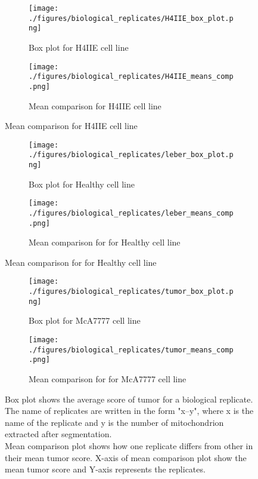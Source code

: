 \begin{figure}[htb!]
    \begin{subfigure}{1\textwidth}
         \centering
        \texttt{[image: ./figures/biological\_replicates/H4IIE\_box\_plot.png]}
        \caption{Box plot for H4IIE cell line}
   \label{fig:fao_raw}
    \end{subfigure}
    \vspace{4em}
  \begin{subfigure}{1\textwidth}
        \centering
       \texttt{[image: ./figures/biological\_replicates/H4IIE\_means\_comp.png]}
        \caption{Mean comparison for H4IIE cell line}
        \label{fig:healthy_raw}
    \end{subfigure}
    
    \end{figure}
    \begin{figure}[htb!]
\ContinuedFloat
    \begin{subfigure}{1\textwidth}
         \centering
        \texttt{[image: ./figures/biological\_replicates/leber\_box\_plot.png]}
        \caption{Box plot for Healthy cell line}
   \label{fig:fao_raw}
    \end{subfigure}
    \begin{subfigure}{1\textwidth}
         \centering
        \texttt{[image: ./figures/biological\_replicates/leber\_means\_comp.png]}
        \caption{Mean comparison for for Healthy cell line}
   \label{fig:fao_raw}
    \end{subfigure}
    
     \end{figure}
    \begin{figure}[htb!]
\ContinuedFloat

 \begin{subfigure}{1\textwidth}
         \centering
        \texttt{[image: ./figures/biological\_replicates/tumor\_box\_plot.png]}
        \caption{Box plot for McA7777 cell line}
   \label{fig:fao_raw}
    \end{subfigure}
    \begin{subfigure}{1\textwidth}
         \centering
        \texttt{[image: ./figures/biological\_replicates/tumor\_means\_comp.png]}
        \caption{Mean comparison for for McA7777 cell line}
   \label{fig:fao_raw}
    \end{subfigure}
    \label{fig:replicate_box_plot}
\caption{Box plot shows the average score of tumor for a biological replicate. The name of replicates are written in the form "x--y", where x is the name of the replicate and y is the number of mitochondrion extracted after segmentation. \\
Mean comparison plot shows how one replicate differs from other in their mean tumor score. X-axis of mean comparison plot show the mean tumor score and Y-axis represents the replicates. }
\end{figure}